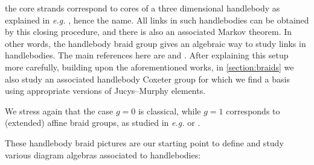 \documentclass[a4paper,11pt]{amsart}
\newcommand{\eg}{\textsl{e.g.}}
\numberwithin{equation}{section}
\let\fullref\autoref
\begin{document}
the core strands correspond to cores of a three dimensional 
handlebody as explained in {\eg} 
\cite[Section 2]{RoTu-homflypt-typea}, hence the name. All links in such handlebodies can 
be obtained by this closing procedure, and there is also an associated 
Markov theorem. In other words, the handlebody braid group gives an 
algebraic way to study links in handlebodies. The main references 
here are \cite{Ve-handlebodies} and \cite{HaOlLa-handlebodies}.
After explaining this setup more carefully, building upon the aforementioned 
works, in \fullref{section:braids} 
we also study an associated handlebody Coxeter group for which we find a basis 
using appropriate versions of Jucys--Murphy elements.

We stress again that the case $g=0$ is classical, while $g=1$ corresponds to 
(extended) affine braid groups, as studied in {\eg} \cite{Brieskorn} or \cite{allcock}.

These handlebody braid pictures are our starting point to define and study 
various diagram algebras associated to handlebodies:
\end{document}

